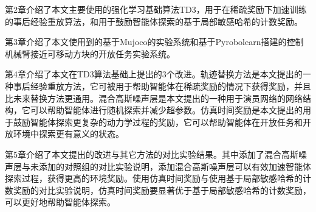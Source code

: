         第2章介绍了本文主要使用的强化学习基础算法TD3，用于在稀疏奖励下加速训练的事后经验重放算法，和用于鼓励智能体探索的基于局部敏感哈希的计数奖励。

        第3章介绍了本文使用到的基于Mujoco的实验系统和基于Pyrobolearn搭建的控制机械臂接近可移动方块的开放任务实验系统。

        第4章介绍了本文在TD3算法基础上提出的3个改进。轨迹替换方法是本文提出的一种事后经验重放方法，它可被用于帮助智能体在稀疏奖励的情况下获得奖励，并且比未来替换方法更通用。混合高斯噪声层是本文提出的一种用于演员网络的网络结构，它可以帮助智能体进行随机探索并减少超参数。仿真时间奖励是本文提出的用于鼓励智能体探索更复杂的动力学过程的奖励，它可以帮助智能体在开放任务和开放环境中探索更有意义的状态。

        第5章介绍了本文提出的改进与其它方法的对比实验结果。其中添加了混合高斯噪声层与未添加的对照组的对比实验说明，添加混合高斯噪声层可以有效加速智能体探索过程，获得更高的环境奖励。使用仿真时间奖励与使用基于局部敏感哈希的计数奖励的对比实验说明，仿真时间奖励要显著优于基于局部敏感哈希的计数奖励，可以更好地帮助智能体探索。
